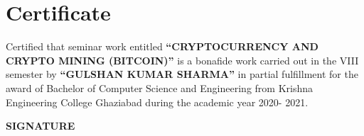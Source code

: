 \chapter*{Certificate}

Certified that seminar work entitled \textbf{“CRYPTOCURRENCY AND CRYPTO MINING (BITCOIN)”} is a bonafide work carried out in the VIII semester by\textbf{ “GULSHAN KUMAR SHARMA”} in partial fulfillment for the award of Bachelor of Computer Science and Engineering from Krishna Engineering College Ghaziabad during the academic year 2020- 2021.

\vspace{1.5cm}

\vspace{2cm}

\begin{minipage}[right]{.4\linewidth}

\textbf{SIGNATURE}

\end{minipage}
